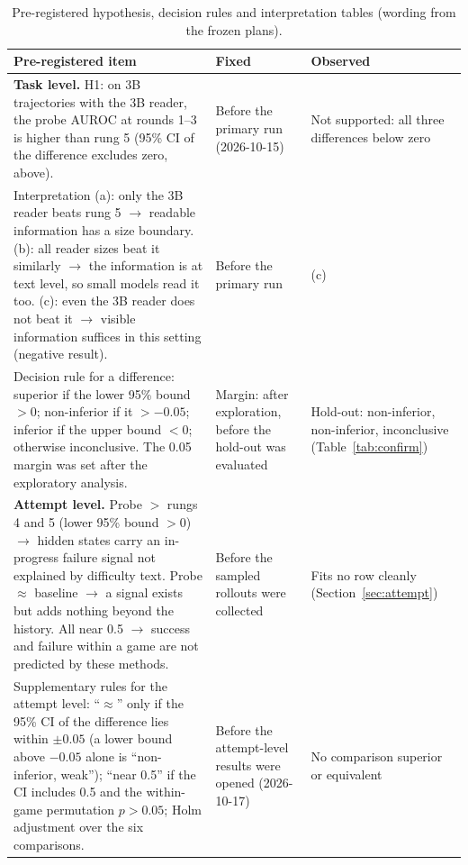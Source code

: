 \documentclass[11pt]{article}
\newcommand{\code}[1]{\texttt{#1}}
\begin{document}
\begin{table}[h]
\centering\small
\caption{Pre-registered hypothesis, decision rules and interpretation tables (wording from the frozen plans).}\label{tab:a7}
\begin{tabularx}{\linewidth}{@{}L>{\raggedright\arraybackslash}p{2.9cm}>{\raggedright\arraybackslash}p{2.9cm}@{}}
\toprule
Pre-registered item & Fixed & Observed \\
\midrule
\textbf{Task level.} H1: on 3B trajectories with the 3B reader, the probe AUROC at rounds 1--3 is higher than rung 5 (95\% CI of the difference excludes zero, above). & Before the primary run (2026-10-15) & Not supported: all three differences below zero \\
\addlinespace
Interpretation (a): only the 3B reader beats rung 5 $\rightarrow$ readable information has a size boundary. (b): all reader sizes beat it similarly $\rightarrow$ the information is at text level, so small models read it too. (c): even the 3B reader does not beat it $\rightarrow$ visible information suffices in this setting (negative result). & Before the primary run & (c) \\
\addlinespace
Decision rule for a difference: superior if the lower 95\% bound $> 0$; non-inferior if it $> -0.05$; inferior if the upper bound $< 0$; otherwise inconclusive. The 0.05 margin was set after the exploratory analysis. & Margin: after exploration, before the hold-out was evaluated & Hold-out: non-inferior, non-inferior, inconclusive (Table~\ref{tab:confirm}) \\
\addlinespace
\textbf{Attempt level.} Probe $>$ rungs 4 and 5 (lower 95\% bound $> 0$) $\rightarrow$ hidden states carry an in-progress failure signal not explained by difficulty text. Probe $\approx$ baseline $\rightarrow$ a signal exists but adds nothing beyond the history. All near 0.5 $\rightarrow$ success and failure within a game are not predicted by these methods. & Before the sampled rollouts were collected & Fits no row cleanly (Section~\ref{sec:attempt}) \\
\addlinespace
Supplementary rules for the attempt level: ``$\approx$'' only if the 95\% CI of the difference lies within $\pm 0.05$ (a lower bound above $-0.05$ alone is ``non-inferior, weak''); ``near 0.5'' if the CI includes 0.5 and the within-game permutation $p > 0.05$; Holm adjustment over the six comparisons. & Before the attempt-level results were opened (2026-10-17) & No comparison superior or equivalent \\
\bottomrule
\end{tabularx}
\par\smallskip\raggedright\footnotesize
\end{table}
\end{document}
